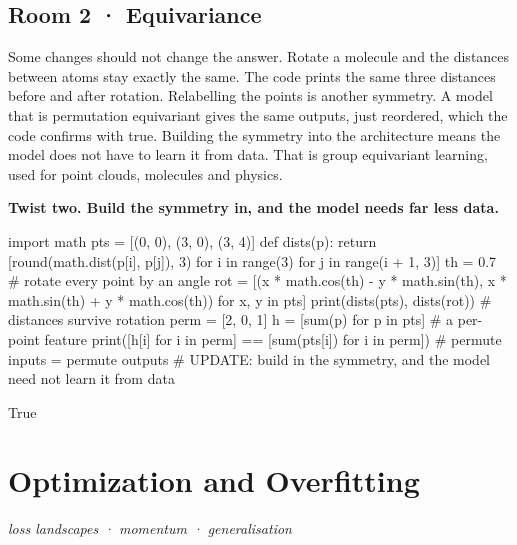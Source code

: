 \documentclass[11pt,a4paper]{report}
\begin{document}
\section*{Room 2 · Equivariance}
Some changes should not change the answer. Rotate a molecule and the distances between atoms stay exactly the same. The code prints the same three distances before and after rotation. Relabelling the points is another symmetry. A model that is permutation equivariant gives the same outputs, just reordered, which the code confirms with true. Building the symmetry into the architecture means the model does not have to learn it from data. That is group equivariant learning, used for point clouds, molecules and physics.
\begin{tcolorbox}[colback=yellow!12,colframe=orange!70!black,boxrule=0.4pt,left=4pt,right=4pt,top=2pt,bottom=2pt]\textbf{Twist two. Build the symmetry in, and the model needs far less data.}\end{tcolorbox}
\begin{Code}
import math
pts = [(0, 0), (3, 0), (3, 4)]
def dists(p): return [round(math.dist(p[i], p[j]), 3) for i in range(3) for j in range(i + 1, 3)]
th = 0.7                                    # rotate every point by an angle
rot = [(x * math.cos(th) - y * math.sin(th), x * math.sin(th) + y * math.cos(th)) for x, y in pts]
print(dists(pts), dists(rot))               # distances survive rotation
perm = [2, 0, 1]
h = [sum(p) for p in pts]                   # a per-point feature
print([h[i] for i in perm] == [sum(pts[i]) for i in perm])   # permute inputs = permute outputs
# UPDATE: build in the symmetry, and the model need not learn it from data
\end{Code}
\begin{Out}
[3.0, 5.0, 4.0] [3.0, 5.0, 4.0]
True
\end{Out}
\chapter{Optimization and Overfitting}
\textit{loss landscapes · momentum · generalisation}
\end{document}

